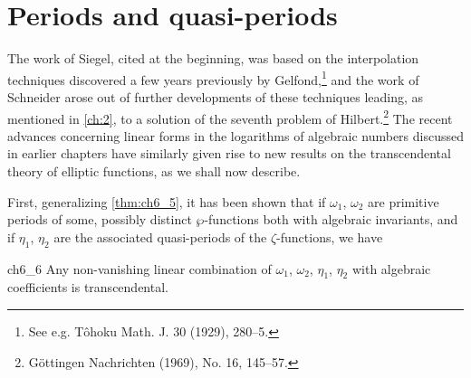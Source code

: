 \section{Periods and quasi-periods}

The work of Siegel, cited at the beginning, was based on the interpolation techniques discovered a few years previously by Gelfond,\footnote{See e.g. T{\^o}hoku Math. J. 30 (1929), 280--5.} and the work of Schneider arose out of further developments of these techniques leading, as mentioned in \autoref{ch:2}, to a solution of the seventh problem of Hilbert.\footnote{G{\"{o}}ttingen Nachrichten (1969), No. 16, 145--57.} The recent advances concerning linear forms in the logarithms of algebraic numbers discussed in earlier chapters have similarly given rise to new results on the transcendental theory of elliptic functions, as we shall now describe.

First, generalizing \autoref{thm:ch6_5}, it has been shown that if $\omega_1$, $\omega_2$ are primitive periods of some, possibly distinct $\wp$-functions both with algebraic invariants, and if $\eta_1$, $\eta_2$ are the associated quasi-periods of the $\zeta$-functions, we have

\begin{mythm}{}{ch6_6}
Any non-vanishing linear combination of $\omega_1$, $\omega_2$, $\eta_1$, $\eta_2$ with algebraic coefficients is transcendental.
\end{mythm}

